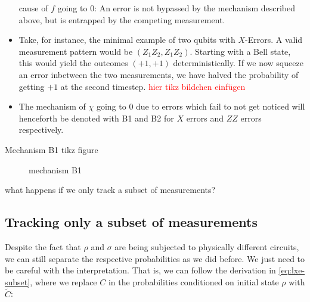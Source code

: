 \begin{itemize}
    cause of $f$ going to $0$: An error is not bypassed by the mechanism
    described above, but is entrapped by the competing measurement.
  \item Take, for instance, the minimal example of two qubits with $X$-Errors.
    A valid measurement pattern would be $(Z_1Z_2, Z_1Z_2)$. Starting with a
    Bell state, this would yield the outcomes $(+1, +1)$ deterministically. If
    we now squeeze an error inbetween the two measurements, we have halved the
    probability of getting $+1$ at the second timestep. \textcolor{red}{hier
    tikz bildchen einf\"ugen}
    \item The mechanism of $\chi$ going to $0$ due to errors which fail to not 
    get noticed will henceforth be denoted with \textsf{B1} and \textsf{B2} for
    $X$ errors and $ZZ$ errors respectively.
\end{itemize}
Mechanism \textsf{B1} tikz figure
\begin{figure}[h]
  \centering
  
  \caption{mechanism \textsf{B1}}
  \label{fig:mech-b1-lxe}
\end{figure}



what happens if we only track a subset of measurements?
\subsection{Tracking only a subset of measurements}
\label{sec:lxe-err-subset}
Despite the fact that $\rho$ and $\sigma$ are being subjected to physically
different circuits, we can still separate the respective probabilities as we
did before. We just need to be careful with the interpretation. That is, we can
follow the derivation in \cref{eq:lxe-subset}, where we replace $C$ in the
probabilities conditioned on initial state $\rho$ with $\tilde{C}$:

